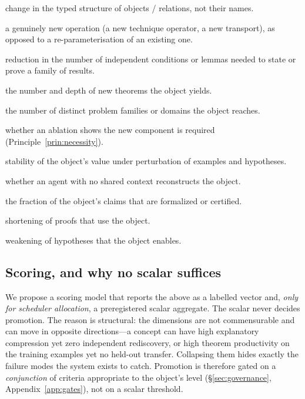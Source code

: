 \documentclass[11pt]{article}
\theoremstyle{definition}
\theoremstyle{remark}
\begin{document}
\begin{description}[leftmargin=1.4em,itemsep=1pt]
  \item[Structural novelty] change in the typed structure of objects / relations, not their names.
  \item[Operational novelty] a genuinely new operation (a new technique operator, a new transport),
  as opposed to a re-parameterisation of an existing one.
  \item[Explanatory compression] reduction in the number of independent conditions or lemmas needed
  to state or prove a family of results.
  \item[Theorem productivity] the number and depth of new theorems the object yields.
  \item[Transfer breadth] the number of distinct problem families or domains the object reaches.
  \item[Counterfactual necessity] whether an ablation shows the new component is required
  (Principle~\ref{prin:necessity}).
  \item[Robustness] stability of the object's value under perturbation of examples and hypotheses.
  \item[Independent rediscovery] whether an agent with no shared context reconstructs the object.
  \item[Formal-verification coverage] the fraction of the object's claims that are formalized or
  certified.
  \item[Proof-complexity reduction] shortening of proofs that use the object.
  \item[Hypothesis-complexity reduction] weakening of hypotheses that the object enables.
\end{description}

\subsection{Scoring, and why no scalar suffices}

We propose a scoring model that reports the above as a labelled vector and, \emph{only for scheduler
allocation}, a preregistered scalar aggregate. The scalar never decides promotion. The reason is
structural: the dimensions are not commensurable and can move in opposite directions---a concept can
have high explanatory compression yet zero independent rediscovery, or high theorem productivity on
the training examples yet no held-out transfer. Collapsing them hides exactly the failure modes the
system exists to catch. Promotion is therefore gated on a \emph{conjunction} of criteria appropriate
to the object's level (\S\ref{sec:governance}, Appendix~\ref{app:gates}), not on a scalar threshold.
\end{document}
